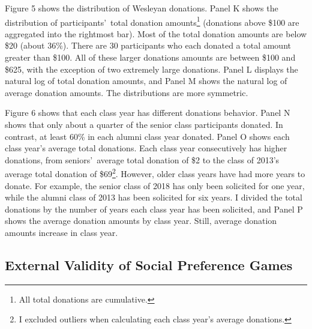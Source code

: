 \documentclass[12pt]{article}
\begin{document}
Figure 5 shows the distribution of Wesleyan donations. Panel K shows the distribution of participants\rq \ total donation amounts\footnote{All total donations are cumulative.} (donations above \$100 are aggregated into the rightmost bar). Most of the total donation amounts are below \$20 (about 36\%). There are 30 participants who each donated a total amount greater than \$100. All of these larger donations amounts are between \$100 and \$625, with the exception of two extremely large donations. Panel L displays the natural log of total donation amounts, and Panel M shows the natural log of average donation amounts. The distributions are more symmetric.

Figure 6 shows that each class year has different donations behavior. Panel N shows that only about a quarter of the senior class participants donated. In contrast, at least 60\% in each alumni class year donated. Panel O shows each class year\rq s average total donations. Each class year consecutively has higher donations, from seniors\rq \ average total donation of \$2 to the class of 2013\rq s average total donation of \$69\footnote{I excluded outliers when calculating each class year\rq s average donations.}. However, older class years have had more years to donate. For example, the senior class of 2018 has only been solicited for one year, while the alumni class of 2013 has been solicited for six years. I divided the total donations by the number of years each class year has been solicited, and Panel P shows the average donation amounts by class year. Still, average donation amounts increase in class year.


\subsection{External Validity of Social Preference Games}
\end{document}
